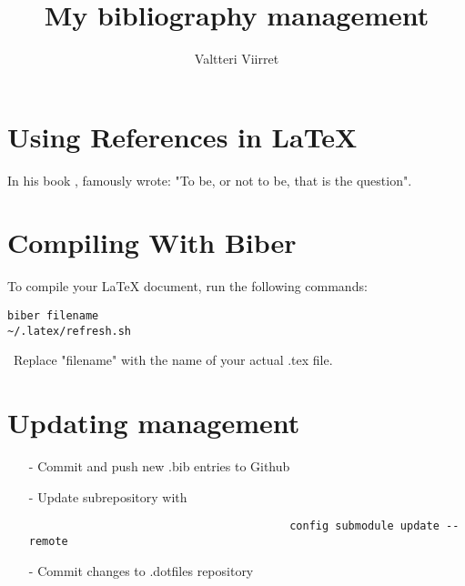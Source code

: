 \documentclass{article}
\author{Valtteri Viirret}
\title{My bibliography management}
\begin{document}
\maketitle

\section{Using References in LaTeX}

In his book \textcite{shakespeare}, famously wrote: "To be, or not to be, that is the question".

\section{Compiling With Biber}

To compile your LaTeX document, run the following commands:

\begin{verbatim}
biber filename
~/.latex/refresh.sh
\end{verbatim}\
Replace "filename" with the name of your actual .tex file.

\section{Updating management}
\begin{itemize}
	\item[-] Commit and push new .bib entries to Github
	\item[-] Update subrepository with \begin{verbatim}
										config submodule update --remote
										\end{verbatim}
	\item[-] Commit changes to .dotfiles repository
\end{itemize}

\printbibliography
\end{document}
